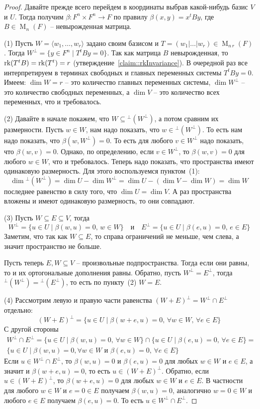 \begin{proof}
Давайте прежде всего перейдем в координаты выбрав какой-нибудь базис $V$ и $U$.
Тогда получим $\beta\colon F^n \times F^n \to F$ по правилу $\beta(x,y) = x^t B y$, где $B\in \operatorname{M}_n(F)$ -- невырожденная матрица.

(1) Пусть $W = \langle w_1,\ldots,w_r \rangle$ задано своим базисом и $T = (w_1|\ldots|w_r)\in \operatorname{M}_{n\,r}(F)$.
Тогда $W^\bot = \{y\in F^n \mid T^tB y = 0\}$.
Так как матрица $B$ невырожденная, то $\operatorname{rk}(T^t B) = \operatorname{rk} (T^t) = r$ (утверждение~\ref{claim::rkInvariance}).
В очередной раз все интерпретируем в терминах свободных и главных переменных системы $T^t By = 0$.
Имеем: $\dim W = r$ -- это количество главных переменных системы, $\dim W^\bot$ -- это количество свободных переменных, а $\dim V$ -- это количество всех переменных, что и требовалось.

(2) Давайте в начале покажем, что $W \subseteq {}^\bot(W^\bot)$, а потом сравним их размерности.
Пусть $w\in W$, нам надо показать, что $w\in {}^\bot (W^\bot)$.
То есть нам надо показать, что $\beta(w, W^\bot) = 0$.
То есть для любого $v\in W^\bot$ надо показать, что $\beta(w,v) = 0$.
Однако, по определению, если $v\in W^\bot$, то $\beta(w, v) = 0$ для любого $w\in W$, что и требовалось.
Теперь надо показать, что пространства имеют одинаковую размерность.
Для этого воспользуемся пунктом~(1):
\[
\dim {}^\bot (W^\bot) = \dim U - \dim W^\bot = \dim U- (\dim V - \dim W) = \dim W
\]
последнее равенство в силу того, что $\dim U = \dim V$.
А раз пространства вложены и имеют одинаковую размерность, то они совпадают.

(3) Пусть $W\subseteq E\subseteq V$, тогда
\[
W^\bot = \{u\in U\mid \beta(w, u) = 0,\,w\in W\} \quad \text{и} \quad E^\bot = \{u\in U\mid \beta(e, u) = 0,\,e\in E\}
\]
Заметим, что так как $W\subseteq E$, то справа ограничений не меньше, чем слева, а значит пространство не больше.

Пусть теперь $E, W\subseteq V$ -- произвольные подпространства.
Тогда если они равны, то и их ортогональные дополнения равны.
Обратно, пусть $W^\bot = E^\bot$, тогда ${}^\bot(W^\bot) = {}^\bot(E^\bot)$, то есть по пункту~(2) $W = E$.

(4) Рассмотрим левую и правую части равенства $(W + E)^\bot = W^\bot\cap E^\bot$ отдельно:
\[
(W+E)^\bot = \{u\in U\mid \beta(w + e, u) = 0,\,\forall w\in W,\,\forall e\in E\}
\]
С другой стороны
\begin{gather*}
W^\bot\cap E^\bot = \{u\in U\mid \beta(w, u) = 0,\,\forall w\in W\}\cap \{u\in U\mid \beta(e,u) = 0,\,\forall e\in E\} =\\
\{u\in U\mid \beta(w,u) = 0,\forall w\in W\text{ и }\beta(e,u)=0,\,\forall e\in E\}
\end{gather*}
Если $u\in W^\bot\cap E^\bot$, то $\beta(w,u) = 0$ и $\beta(e,u) = 0$ для любых $w\in W$ и $e\in E$, а значит и $\beta(w + e, u) = 0$, то есть $u\in (W+E)^\bot$.
Обратно, если $u\in (W+E)^\bot$, то $\beta(w+e,u) = 0$ для любых $w\in W$ и $e\in E$.
В частности для любого $w\in W$ и $e = 0\in E$ получаем $\beta(w, u) = 0$, аналогично $w = 0\in W$ и любого $e \in E$ получаем $\beta(e, u) = 0$.
То есть $u\in W^\bot\cap E^\bot$.


\end{proof}
